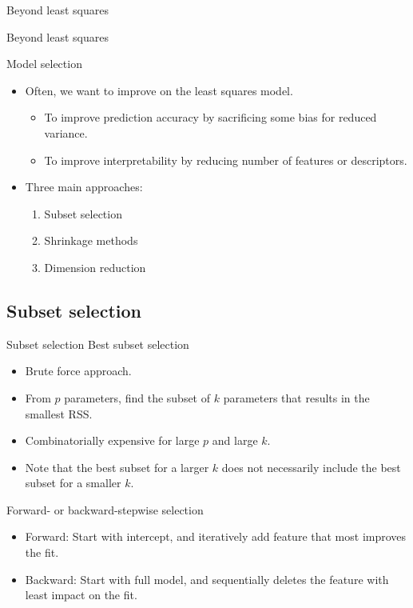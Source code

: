\documentclass{beamer}
\begin{document}
\begin{frame}{Beyond least squares}
    \Huge{\centerline{Beyond least squares}}
\end{frame} 

\begin{frame}{Model selection}
    \begin{itemize}
        \item Often, we want to improve on the least squares model.
        \begin{itemize}
            \item To improve prediction accuracy by sacrificing some bias for reduced variance.
            \item To improve interpretability by reducing number of features or descriptors.
        \end{itemize}
        \item Three main approaches:
        \begin{enumerate}
            \item Subset selection
            \item Shrinkage methods
            \item Dimension reduction
        \end{enumerate}
    \end{itemize}
\end{frame}


\subsection{Subset selection}

\begin{frame}{Subset selection}
    Best subset selection
    \begin{itemize}
        \item Brute force approach.
        \item From $p$ parameters, find the subset of $k$ parameters that results in the smallest RSS.
        \item Combinatorially expensive for large $p$ and large $k$.
        \item Note that the best subset for a larger $k$ does not necessarily include the best subset for a smaller $k$.
    \end{itemize}
    Forward- or backward-stepwise selection
    \begin{itemize}
        \item Forward: Start with intercept, and iteratively add feature that most improves the fit.
        \item Backward: Start with full model, and sequentially deletes the feature with least impact on the fit.
    \end{itemize}
\end{frame} 
\end{document}
